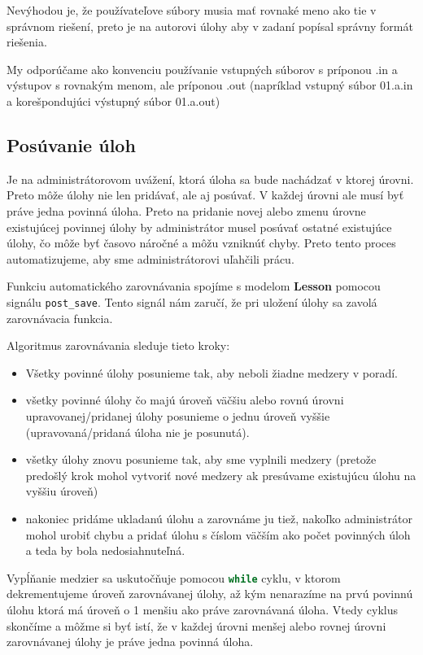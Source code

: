 Nevýhodou je, že používateľove súbory musia mať rovnaké meno ako tie v správnom riešení,
preto je na autorovi úlohy aby v zadaní popísal správny formát riešenia.

My odporúčame ako konvenciu používanie vstupných súborov s príponou .in a výstupov
s rovnakým menom, ale príponou .out (napríklad vstupný súbor 01.a.in a korešpondujúci výstupný súbor 01.a.out)

\subsection{Posúvanie úloh}
\label{implementacia:posuvanie}
Je na administrátorovom uvážení, ktorá úloha sa bude nachádzať v ktorej úrovni.
Preto môže úlohy nie len pridávať, ale aj posúvať. V každej úrovni ale musí
byť práve jedna povinná úloha. Preto na pridanie novej alebo zmenu úrovne existujúcej
povinnej úlohy by administrátor musel posúvať ostatné existujúce úlohy,
čo môže byť časovo náročné a môžu vzniknúť chyby. Preto tento proces automatizujeme,
aby sme administrátorovi uľahčili prácu.

Funkciu automatického zarovnávania
spojíme s modelom \textbf{Lesson} pomocou signálu \lstinline[language=Python]{post_save}.
Tento signál nám zaručí, že pri uložení úlohy sa zavolá zarovnávacia funkcia.

Algoritmus zarovnávania sleduje tieto kroky:
\begin{itemize}
\item Všetky povinné úlohy posunieme tak, aby neboli žiadne medzery v poradí.
\item všetky povinné úlohy čo majú úroveň väčšiu alebo rovnú úrovni upravovanej/pridanej
 úlohy posunieme o jednu úroveň vyššie (upravovaná/pridaná úloha nie je posunutá).
\item všetky úlohy znovu posunieme tak, aby sme vyplnili medzery (pretože predošlý krok mohol
    vytvoriť nové medzery ak presúvame existujúcu úlohu na vyššiu úroveň)
\item nakoniec pridáme ukladanú úlohu a zarovnáme ju tiež, nakoľko administrátor mohol urobiť chybu a pridať úlohu
    s číslom väčším ako počet povinných úloh a teda by bola nedosiahnuteľná.
\end{itemize}

Vypĺňanie medzier sa uskutočňuje pomocou \lstinline[language=Python]{while} cyklu,
v ktorom dekrementujeme úroveň zarovnávanej úlohy, až kým nenarazíme na prvú povinnú úlohu ktorá má
úroveň o 1 menšiu ako práve zarovnávaná úloha. Vtedy cyklus skončíme a môžme si byť istí,
že v každej úrovni menšej alebo rovnej úrovni zarovnávanej úlohy je práve jedna povinná úloha.

